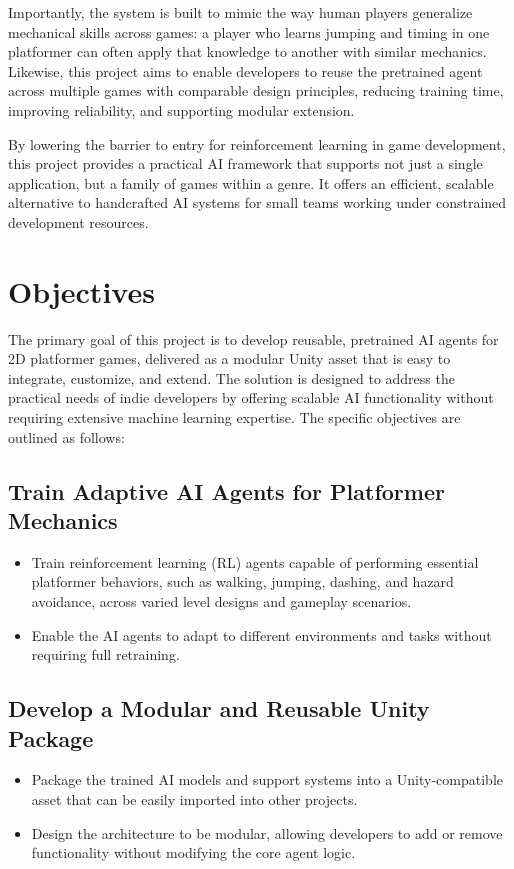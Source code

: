 \documentclass[12pt,oneside,openright,a4paper]{cpe-english-project}
\begin{document}
Importantly, the system is built to mimic the way human players generalize mechanical skills across games: a player who learns jumping and timing in one platformer can often apply that knowledge to another with similar mechanics. Likewise, this project aims to enable developers to reuse the pretrained agent across multiple games with comparable design principles, reducing training time, improving reliability, and supporting modular extension.\par

By lowering the barrier to entry for reinforcement learning in game development, this project provides a practical AI framework that supports not just a single application, but a family of games within a genre. It offers an efficient, scalable alternative to handcrafted AI systems for small teams working under constrained development resources.\par

\section{Objectives}
The primary goal of this project is to develop reusable, pretrained AI agents for 2D platformer games, delivered as a modular Unity asset that is easy to integrate, customize, and extend. The solution is designed to address the practical needs of indie developers by offering scalable AI functionality without requiring extensive machine learning expertise. The specific objectives are outlined as follows:
\subsection{Train Adaptive AI Agents for Platformer Mechanics}
\begin{itemize}
\item Train reinforcement learning (RL) agents capable of performing essential platformer behaviors, such as walking, jumping, dashing, and hazard avoidance, across varied level designs and gameplay scenarios.
\item Enable the AI agents to adapt to different environments and tasks without requiring full retraining.
\end{itemize}
\subsection{Develop a Modular and Reusable Unity Package}
\begin{itemize}
\item Package the trained AI models and support systems into a Unity-compatible asset that can be easily imported into other projects.
\item Design the architecture to be modular, allowing developers to add or remove functionality without modifying the core agent logic.
\end{itemize}
\end{document}

